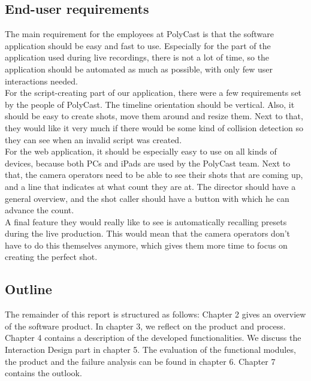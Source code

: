 \subsection{End-user requirements}
The main requirement for the employees at PolyCast is that the software application should be easy and fast to use. Especially for the part of the application used during live recordings, there is not a lot of time, so the application should be automated as much as possible, with only few user interactions needed.\\
For the script-creating part of our application, there were a few requirements set by the people of PolyCast. The timeline orientation should be vertical. Also, it should be easy to create shots, move them around and resize them. Next to that, they would like it very much if there would be some kind of collision detection so they can see when an invalid script was created.\\
For the web application, it should be especially easy to use on all kinds of devices, because both PCs and iPads are used by the PolyCast team. Next to that, the camera operators need to be able to see their shots that are coming up, and a line that indicates at what count they are at. The director should have a general overview, and the shot caller should have a button with which he can advance the count.\\
A final feature they would really like to see is automatically recalling presets during the live production. This would mean that the camera operators don't have to do this themselves anymore, which gives them more time to focus on creating the perfect shot.

\subsection{Outline}
The remainder of this report is structured as follows: Chapter 2 gives an overview of the software product. In chapter 3, we reflect on the product and process. Chapter 4 contains a description of the developed functionalities. We discuss the Interaction Design part in chapter 5. The evaluation of the functional modules, the product and the failure analysis can be found in chapter 6. Chapter 7 contains the outlook.